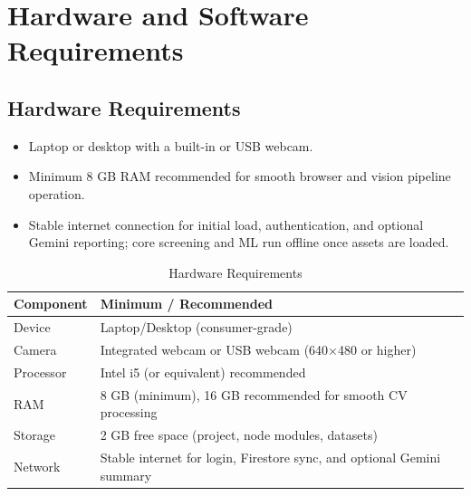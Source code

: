 \documentclass[12pt,a4paper]{report}
\begin{document}
\section{Hardware and Software Requirements}
\subsection{Hardware Requirements}
\begin{itemize}
    \item Laptop or desktop with a built-in or USB webcam.
    \item Minimum 8 GB RAM recommended for smooth browser and vision pipeline operation.
    \item Stable internet connection for initial load, authentication, and optional Gemini reporting; core screening and ML run offline once assets are loaded.
\end{itemize}
\begin{table}[!htbp]
    \centering
    \caption{Hardware Requirements}
    \renewcommand{\arraystretch}{1.35}
    \begin{tabular}{|p{4.2cm}|p{9.2cm}|}
        \hline
        \textbf{Component} & \textbf{Minimum / Recommended} \\
        \hline
        Device & Laptop/Desktop (consumer-grade) \\
        \hline
        Camera & Integrated webcam or USB webcam (640$\times$480 or higher) \\
        \hline
        Processor & Intel i5 (or equivalent) recommended \\
        \hline
        RAM & 8 GB (minimum), 16 GB recommended for smooth CV processing \\
        \hline
        Storage & 2 GB free space (project, node modules, datasets) \\
        \hline
        Network & Stable internet for login, Firestore sync, and optional Gemini summary \\
        \hline
    \end{tabular}
\end{table}
\end{document}
